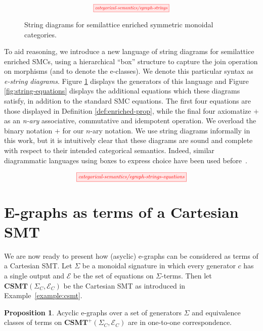\documentclass[sigconf, 9pt, nonacm]{acmart}
\theoremstyle{definition}
\newtheorem{proposition}[thm]{Proposition}
\begin{document}
\begin{figure}
    \[
        \scalebox{0.65}{
        \tikzfig{categorical-semantics/egraph-strings}
        }
    \]
    \captionsetup{belowskip=-5ex}
    \caption{String diagrams for semilattice enriched symmetric monoidal categories.}
    \label{fig:egraph-strings}
    \end{figure}
    

To aid reasoning, we introduce a new language of string diagrams for semilattice enriched SMCs, using a hierarchical ``box'' structure to capture the join operation on morphisms (and to denote the e-classes).
We denote this particular syntax as \textit{e-string diagrams}.
Figure \ref{fig:egraph-strings} displays the generators of this language and Figure \ref{fig:string-equations} displays the additional equations which these diagrams satisfy, in addition to the standard SMC equations. 
The first four equations are those displayed in Definition \ref{def:enriched-prop},  while the final four axiomatize $+$ as an \textit{n-ary} associative, commutative and idempotent operation.  We overload the binary notation $+$ for our $n$-ary notation.  
We use string diagrams informally in this work, but it is intuitively clear that these diagrams are sound and complete with respect to their intended categorical semantics. 
Indeed, similar diagrammatic languages using boxes to express choice have been used before~\cite{duncan_generalised_2009}. 

\begin{figure*}
\[  
    \scalebox{0.75}{
	\tikzfig{categorical-semantics/egraph-strings-equations}
    }
\]
\caption{Equations for a  semilattice enriched symmetric monoidal category}
\label{fig:string-equations}
\end{figure*}

\section{E-graphs as terms of a Cartesian SMT}
We are now ready to present how (asyclic) e-graphs can be considered as terms of a Cartesian SMT.
Let $\Sigma$ be a monoidal signature in which every generator $c$ has a single output and $\mathcal{E}$ be the set of equations on $\Sigma$-terms. 
Then let $\textbf{CSMT}(\Sigma_{C},\mathcal{E}_{C})$ be the Cartesian SMT as introduced in Example~\ref{example:csmt}.
\begin{proposition}
    Acyclic e-graphs over a set of generators $\Sigma$ and equivalence classes of terms on $\textbf{CSMT}^{+}(\Sigma_{C},\mathcal{E}_{C})$ are in one-to-one correspondence.
\end{proposition}
\end{document}
